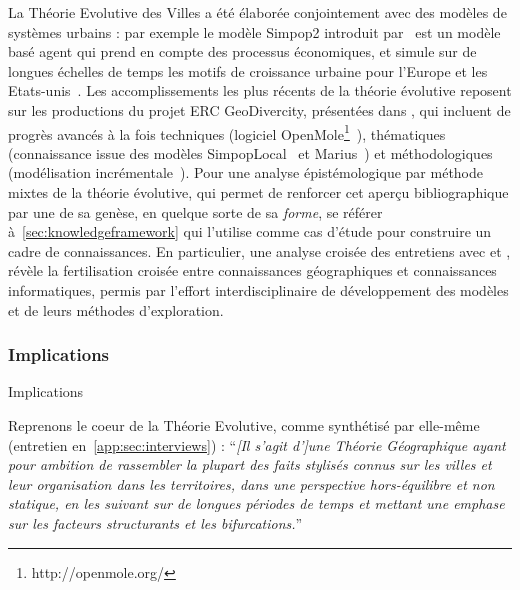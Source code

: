 

La Théorie Evolutive des Villes a été élaborée conjointement avec des modèles de systèmes urbains : par exemple le modèle Simpop2 introduit par~\cite{bretagnolle2006theory} est un modèle basé agent qui prend en compte des processus économiques, et simule sur de longues échelles de temps les motifs de croissance urbaine pour l'Europe et les Etats-unis~\cite{doi:10.1177/0042098010377366}. Les accomplissements les plus récents de la théorie évolutive reposent sur les productions du projet ERC GeoDivercity, présentées dans \cite{pumain2017urban}, qui incluent de progrès avancés à la fois techniques (logiciel OpenMole\footnote{http://openmole.org/}~\cite{reuillon2013openmole}), thématiques (connaissance issue des modèles SimpopLocal~\cite{schmitt2014modelisation} et Marius~\cite{cottineau2014evolution}) et méthodologiques (modélisation incrémentale~\cite{cottineau2015incremental}). Pour une analyse épistémologique par méthode mixtes de la théorie évolutive, qui permet de renforcer cet aperçu bibliographique par une de sa genèse, en quelque sorte de sa \emph{forme}, se référer à~\ref{sec:knowledgeframework} qui l'utilise comme cas d'étude pour construire un cadre de connaissances. En particulier, une analyse croisée des entretiens avec  et , révèle la fertilisation croisée entre connaissances géographiques et connaissances informatiques, permis par l'effort interdisciplinaire de développement des modèles et de leurs méthodes d'exploration.



\subsubsection*{Implications}{Implications}


Reprenons le coeur de la Théorie Evolutive, comme synthétisé par  elle-même (entretien en~\ref{app:sec:interviews}) : ``\textit{[Il s'agit d']une Théorie Géographique ayant pour ambition de rassembler la plupart des faits stylisés connus sur les villes et leur organisation dans les territoires, dans une perspective hors-équilibre et non statique, en les suivant sur de longues périodes de temps et mettant une emphase sur les facteurs structurants et les bifurcations.}''


